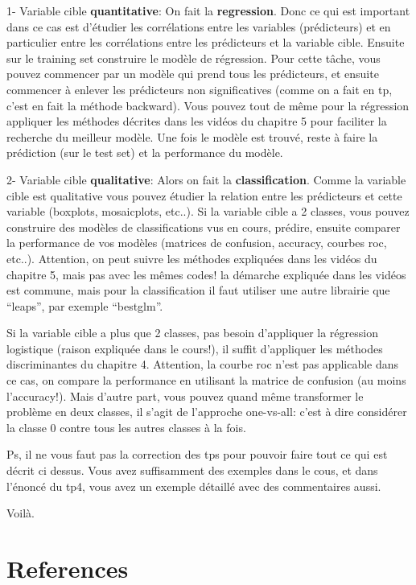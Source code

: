 \documentclass[]{book}
\theoremstyle{definition}
\theoremstyle{definition}
\theoremstyle{definition}
\theoremstyle{remark}
\begin{document}
1- Variable cible \textbf{quantitative}: On fait la \textbf{regression}.
Donc ce qui est important dans ce cas est d'étudier les corrélations
entre les variables (prédicteurs) et en particulier entre les
corrélations entre les prédicteurs et la variable cible. Ensuite sur le
training set construire le modèle de régression. Pour cette tâche, vous
pouvez commencer par un modèle qui prend tous les prédicteurs, et
ensuite commencer à enlever les prédicteurs non significatives (comme on
a fait en tp, c'est en fait la méthode backward). Vous pouvez tout de
même pour la régression appliquer les méthodes décrites dans les vidéos
du chapitre 5 pour faciliter la recherche du meilleur modèle. Une fois
le modèle est trouvé, reste à faire la prédiction (sur le test set) et
la performance du modèle.

2- Variable cible \textbf{qualitative}: Alors on fait la
\textbf{classification}. Comme la variable cible est qualitative vous
pouvez étudier la relation entre les prédicteurs et cette variable
(boxplots, mosaicplots, etc..). Si la variable cible a 2 classes, vous
pouvez construire des modèles de classifications vus en cours, prédire,
ensuite comparer la performance de vos modèles (matrices de confusion,
accuracy, courbes roc, etc..). Attention, on peut suivre les méthodes
expliquées dans les vidéos du chapitre 5, mais pas avec les mêmes codes!
la démarche expliquée dans les vidéos est commune, mais pour la
classification il faut utiliser une autre librairie que ``leaps'', par
exemple ``bestglm''.

Si la variable cible a plus que 2 classes, pas besoin d'appliquer la
régression logistique (raison expliquée dans le cours!), il suffit
d'appliquer les méthodes discriminantes du chapitre 4. Attention, la
courbe roc n'est pas applicable dans ce cas, on compare la performance
en utilisant la matrice de confusion (au moins l'accuracy!). Mais
d'autre part, vous pouvez quand même transformer le problème en deux
classes, il s'agit de l'approche one-vs-all: c'est à dire considérer la
classe 0 contre tous les autres classes à la fois.

Ps, il ne vous faut pas la correction des tps pour pouvoir faire tout ce
qui est décrit ci dessus. Vous avez suffisamment des exemples dans le
cous, et dans l'énoncé du tp4, vous avez un exemple détaillé avec des
commentaires aussi.

Voilà.

\chapter{References}\label{references}


\end{document}
